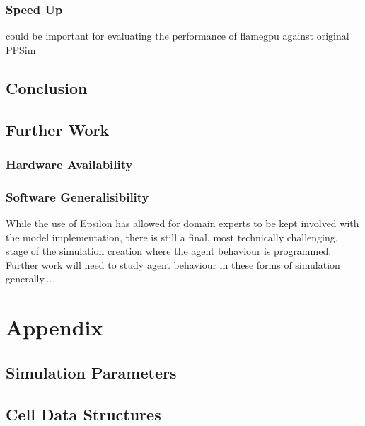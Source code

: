 \documentclass{UoYCSproject}
\begin{document}
\subsection{Speed Up}
\cite{statistical_tests} could be important for evaluating the performance of \acrshort{flamegpu} against original PPSim

\section{Conclusion}

\section{Further Work}
\subsection{Hardware Availability}

\subsection{Software Generalisibility}%
While the use of Epsilon has allowed for domain experts to be kept involved with the model implementation, there is still a final, most technically challenging, stage of the simulation creation where the agent behaviour is programmed.
Further work will need to study agent behaviour in these forms of simulation generally...

\printbibliography
\chapter{Appendix}
\section{Simulation Parameters}


\section{Cell Data Structures}
\end{document}
